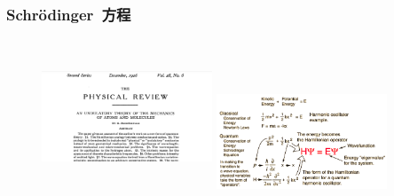 {%
%
\frame
{
	\frametitle{\textrm{Schr\"odinger}~方程}
\begin{minipage}{0.49\textwidth}
\begin{figure}[h!]
\centering
%
\vspace{-25.5pt}
\includegraphics[height=1.80in,width=2.00in,viewport=180 0 1380 1100,clip]{Figures/Schrodinger_article.png}
\includegraphics[height=1.20in,width=2.00in,viewport=0 0 600 350,clip]{Figures/Schrodinger_Equation.png}
\label{Schrodinger_Equation}
\end{figure}
\end{minipage}
}}
